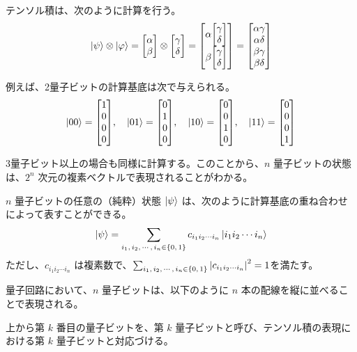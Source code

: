 テンソル積は、次のように計算を行う。
\begin{align}
    \ket{\psi}\otimes\ket{\varphi} = \mqty[\alpha \\ \beta]\otimes\mqty[\gamma \\ \delta] = \mqty[\alpha\mqty[\gamma \\ \delta] \\ \beta\mqty[\gamma \\ \delta]] = \mqty[\alpha\gamma \\ \alpha\delta \\ \beta\gamma \\ \beta\delta]
\end{align}

例えば、2量子ビットの計算基底は次で与えられる。
\begin{align}
    \ket{00} = \mqty[1 \\ 0 \\ 0 \\ 0],\quad
    \ket{01} = \mqty[0 \\ 1 \\ 0 \\ 0],\quad
    \ket{10} = \mqty[0 \\ 0 \\ 1 \\ 0],\quad
    \ket{11} = \mqty[0 \\ 0 \\ 0 \\ 1]
\end{align}

3量子ビット以上の場合も同様に計算する。このことから、$n$ 量子ビットの状態は、$2^n$ 次元の複素ベクトルで表現されることがわかる。

$n$ 量子ビットの任意の（純粋）状態 $\ket{\psi}$ は、次のように計算基底の重ね合わせによって表すことができる。
\begin{align}
    \ket{\psi} = \sum_{i_1,\,i_2,\,\cdots,\,i_n \in \{0,\,1\}} c_{i_1i_2\cdots i_n}\ket{i_1i_2\cdots i_n}
\end{align}
ただし、$c_{i_1i_2\cdots i_n}$ は複素数で、$\sum_{i_1,\,i_2,\,\cdots,\,i_n \in \{0,\,1\}} \abs{c_{i_1i_2\cdots i_n}}^2 = 1$を満たす。

量子回路において、$n$ 量子ビットは、以下のように $n$ 本の配線を縦に並べることで表現される。
\begin{figure}[H]
    \centering
\end{figure}
上から第 $k$ 番目の量子ビットを、第 $k$ 量子ビットと呼び、テンソル積の表現における第 $k$ 量子ビットと対応づける。


